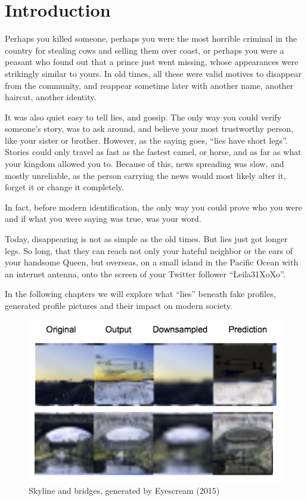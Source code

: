 \section{Introduction}

Perhaps you killed someone, perhaps you were the most horrible criminal in the country for stealing cows and selling them over coast, or perhaps you were a peasant who found out that a prince just went missing, whose appearances were strikingly similar to yours. In old times, all these were valid motives to disappear from the community, and reappear sometime later with another name, another haircut, another identity.

It was also quiet easy to tell lies, and gossip. The only way you could verify someone's story, was to ask around, and believe your most trustworthy person, like your sister or brother. However, as the saying goes, ``lies have short legs''. Stories could only travel as fast as the fastest camel, or horse, and as far as what your kingdom allowed you to. Because of this, news spreading was slow, and mostly unreliable, as the person carrying the news would most likely alter it, forget it or change it completely.

In fact, before modern identification, the only way you could prove who you were and if what you were saying was true, was your word.

Today, disappearing is not as simple as the old times. But lies just got longer legs. So long, that they can reach not only your hateful neighbor or the ears of your handsome Queen, but overseas, on a small island in the Pacific Ocean with an internet antenna, onto the screen of your Twitter follower ``Leila31XoXo''.

In the following chapters we will explore what ``lies'' beneath fake profiles, generated profile pictures and their impact on modern society.

\begin{figure}
    \includegraphics[width=\linewidth]{00_Introduction/eyescream_predicted16.png}
    \caption{Skyline and bridges, generated by Eyescream (2015)}
    \label{fig:eyescream}
\end{figure}

